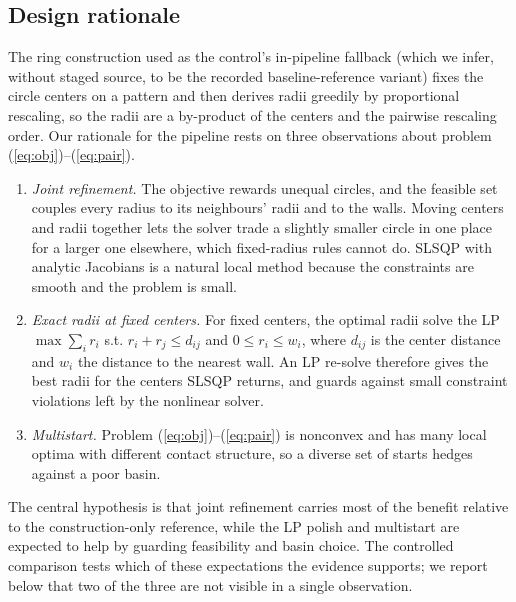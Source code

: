 \documentclass{article} %
\begin{document}
\subsection{Design rationale}
The ring construction used as the control's in-pipeline fallback (which we infer, without staged source, to be the recorded baseline-reference variant) fixes the circle centers on a pattern and then derives radii greedily by proportional rescaling, so the radii are a by-product of the centers and the pairwise rescaling order. Our rationale for the pipeline rests on three observations about problem (\ref{eq:obj})--(\ref{eq:pair}).
\begin{enumerate}
\item \emph{Joint refinement.} The objective rewards unequal circles, and the feasible set couples every radius to its neighbours' radii and to the walls. Moving centers and radii together lets the solver trade a slightly smaller circle in one place for a larger one elsewhere, which fixed-radius rules cannot do. SLSQP with analytic Jacobians is a natural local method because the constraints are smooth and the problem is small.
\item \emph{Exact radii at fixed centers.} For fixed centers, the optimal radii solve the LP $\max \sum_i r_i$ s.t. $r_i+r_j\le d_{ij}$ and $0\le r_i\le w_i$, where $d_{ij}$ is the center distance and $w_i$ the distance to the nearest wall. An LP re-solve therefore gives the best radii for the centers SLSQP returns, and guards against small constraint violations left by the nonlinear solver.
\item \emph{Multistart.} Problem (\ref{eq:obj})--(\ref{eq:pair}) is nonconvex and has many local optima with different contact structure, so a diverse set of starts hedges against a poor basin.
\end{enumerate}
The central hypothesis is that joint refinement carries most of the benefit relative to the construction-only reference, while the LP polish and multistart are expected to help by guarding feasibility and basin choice. The controlled comparison tests which of these expectations the evidence supports; we report below that two of the three are not visible in a single observation.
\end{document}
